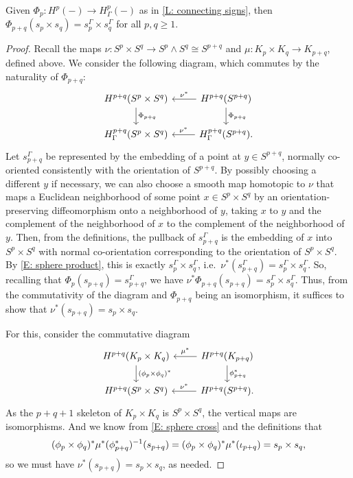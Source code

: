 \begin{corollary}\label{C: sphere product}
	Given $\Phi_p \colon H^p(-) \to H^p_\Gamma(-)$ as in \cref{L: connecting signs}, then $\Phi_{p+q}(s_p \times s_q) = s_p^\Gamma \times s_q^\Gamma$ for all $p,q \geq 1$.
\end{corollary}


\begin{proof}
	Recall the maps $\nu \colon S^p \times S^q \to S^p \wedge S^q \cong S^{p+q}$ and $\mu \colon K_p \times K_q \to K_{p+q}$, defined above.
	We consider the following diagram, which commutes by the naturality of $\Phi_{p+q}$:
	\[
	\begin{tikzcd}
		H^{p+q}(S^p \times S^q) \arrow{d}{\Phi_{p+q}} &
		H^{p+q}(S^{p+q}) \arrow[l, "\nu^*"'] \arrow{d}{\Phi_{p+q}} \\
		H^{p+q}_\Gamma(S^p \times S^q) &
		H_\Gamma^{p+q}(S^{p+q}) \arrow[l, "\nu^*"'].
	\end{tikzcd}
	\]
	Let $s_{p+q}^\Gamma$ be represented by the embedding of a point at $y \in S^{p+q}$, normally co-oriented consistently with the orientation of $S^{p+q}$.
	By possibly choosing a different $y$ if necessary, we can also choose a smooth map homotopic to $\nu$ that maps a Euclidean neighborhood of some point $x \in S^p \times S^q$ by an orientation-preserving diffeomorphism onto a neighborhood of $y$, taking $x$ to $y$ and the complement of the neighborhood of $x$ to the complement of the neighborhood of $y$.
	Then, from the definitions, the pullback of $s_{p+q}^\Gamma$ is the embedding of $x$ into $S^p \times S^q$ with normal co-orientation corresponding to the orientation of $S^p \times S^q$.
	By \cref{E: sphere product}, this is exactly $s_p^\Gamma \times s_q^\Gamma$, i.e.\ $\nu^*(s_{p+q}^\Gamma) = s_p^\Gamma \times s_q^\Gamma$.
	So, recalling that $\Phi_p(s_{p+q}) = s_{p+q}^\Gamma$, we have $\nu^*\Phi_{p+q}(s_{p+q}) = s_p^\Gamma \times s_q^\Gamma$.
	Thus, from the commutativity of the diagram and $\Phi_{p+q}$ being an isomorphism, it suffices to show that $\nu^*(s_{p+q}) = s_p \times s_q$.

	For this, consider the commutative diagram
	\[
	\begin{tikzcd}
		H^{p+q}(K_p \times K_q) \arrow[d, "(\phi_p \times \phi_q)^*"] &
		\arrow[l, "\mu^*"'] H^{p+q}(K_{p+q}) \arrow[d, "\phi_{p+q}^*"] \\
		H^{p+q}(S^p \times S^q) & \arrow[l, "\nu^*"'] H^{p+q}(S^{p+q}).
	\end{tikzcd}
	\]
	As the $p+q+1$ skeleton of $K_p \times K_q$ is $S^p \times S^q$, the vertical maps are isomorphisms.
	And we know from \eqref{E: sphere cross} and the definitions that
	$$(\phi_p \times \phi_q)^*\mu^*(\phi_{p+q}^*)^{-1}(s_{p+q}) = (\phi_p \times \phi_q)^*\mu^*(\iota_{p+q})\\
	= s_p \times s_q,$$
	so we must have $\nu^*(s_{p+q}) = s_p \times s_q$, as needed.
\end{proof}


